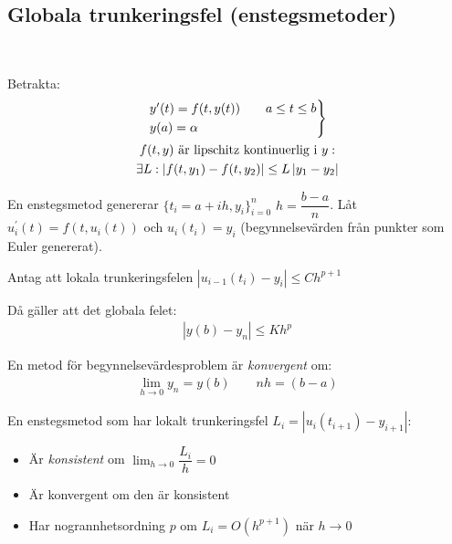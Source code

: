 \subsection{Globala trunkeringsfel (enstegsmetoder)}\hfill\\
\par\bigskip
\noindent Betrakta:
\begin{equation*}
  \begin{gathered}
    \begin{rcases*}
      y^{\prime}(t)=f(t,y(t))\qquad a\leq t \leq b\\
      y(a)=\alpha
    \end{rcases*}\\
    f(t,y)\text{ är lipschitz kontinuerlig i $y$}:\\
    \exists L: \left|f(t,y_1)-f(t,y_2)\right|\leq L\left|y_1-y_2\right|
  \end{gathered}
\end{equation*}\par
\noindent En enstegsmetod genererar $\{t_i = a+ih, y_i\}_{i=0}^n$ $h=\dfrac{b-a}{n}$. Låt $u_i^{\prime}(t)=f(t,u_i(t))$ och $u_i(t_i)=y_i$ (begynnelsevärden från punkter som Euler genererat).\par\bigskip
\noindent Antag att lokala trunkeringsfelen $\left|u_{i-1}(t_i)-y_i\right|\leq Ch^{p+1}$
\par\bigskip
\noindent Då gäller att det globala felet:
\begin{equation*}
  \begin{gathered}
    \left|y(b)-y_n\right|\leq Kh^p
  \end{gathered}
\end{equation*}
\par\bigskip
\noindent En metod för begynnelsevärdesproblem är \textit{konvergent} om:
\begin{equation*}
  \begin{gathered}
    \lim_{h\to0}y_n=y(b)\qquad nh=(b-a)
  \end{gathered}
\end{equation*}
\par\bigskip
\noindent En enstegsmetod som har lokalt trunkeringsfel $L_i=\left|u_i(t_{i+1})-y_{i+1}\right|$:
\begin{itemize}
  \item Är \textit{konsistent }om $\lim_{h\to0}\dfrac{L_i}{h}=0$
  \item Är konvergent om den är konsistent
  \item Har nogrannhetsordning $p$ om $L_i=O(h^{p+1})$ när $h\to0$
\end{itemize}
